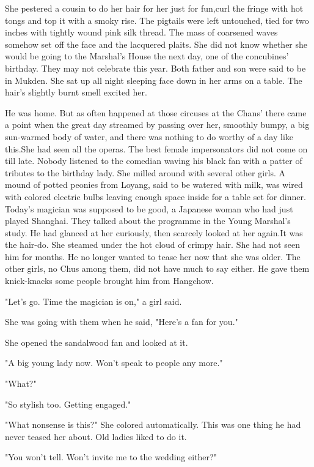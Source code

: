 \par She pestered a cousin to do her hair for her just for fun,curl the fringe with hot tongs and top it with a smoky rise. The pigtails were left untouched, tied for two inches with tightly wound pink silk thread. The mass of coarsened waves somehow set off the face and the lacquered plaits. She did not know whether she would be going to the Marshal's House the next day, one of the concubines' birthday. They may not celebrate this year. Both father and son were said to be in Mukden. She sat up all night sleeping face down in her arms on a table. The hair's slightly burnt smell excited her.
\par He was home. But as often happened at those circuses at the Chans' there came a point when the great day streamed by passing over her, smoothly bumpy, a big sun-warmed body of water, and there was nothing to do worthy of a day like this.She had seen all the operas. The best female impersonators did not come on till late. Nobody listened to the comedian waving his black fan with a patter of tributes to the birthday lady. She milled around with several other girls. A mound of potted peonies from Loyang, said to be watered with milk, was wired with colored electric bulbs leaving enough space inside for a table set for dinner. Today's magician was supposed to be good, a Japanese woman who had just played Shanghai. They talked about the programme in the Young Marshal's study. He had glanced at her curiously, then scarcely looked at her again.It was the hair-do. She steamed under the hot cloud of crimpy hair. She had not seen him for months. He no longer wanted to tease her now that she was older. The other girls, no Chus among them, did not have much to say either. He gave them knick-knacks some people brought him from Hangchow.
\par "Let's go. Time the magician is on," a girl said.
\par She was going with them when he said, "Here's a fan for you."
\par She opened the sandalwood fan and looked at it.
\par "A big young lady now. Won't speak to people any more."
\par "What?"
\par "So stylish too. Getting engaged."
\par "What nonsense is this?" She colored automatically. This was one thing he had never teased her about. Old ladies liked to do it.
\par "You won't tell. Won't invite me to the wedding either?"

